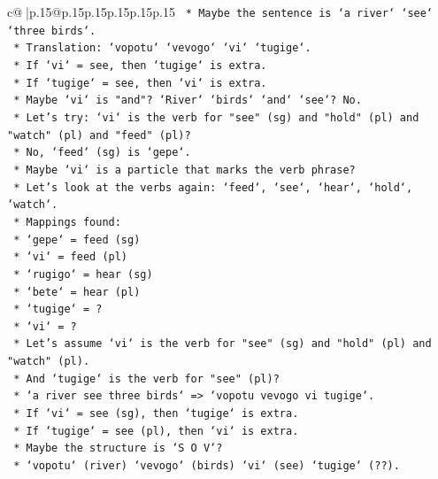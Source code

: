 \documentclass{article}
\begin{document}
{\begin{supertabular}{c@{$\;$}|p{.15\linewidth}@{}p{.15\linewidth}p{.15\linewidth}p{.15\linewidth}p{.15\linewidth}p{.15\linewidth}}
{{{\texttt{                *   Maybe the sentence is `a river` `see` `three birds`.} \\
\texttt{                *   Translation: `vopotu` `vevogo` `vi` `tugige`.} \\
\texttt{                *   If `vi` = see, then `tugige` is extra.} \\
\texttt{                *   If `tugige` = see, then `vi` is extra.} \\
\texttt{                *   Maybe `vi` is "and"? `River` `birds` `and` `see`? No.} \\
\texttt{                *   Let's try: `vi` is the verb for "see" (sg) and "hold" (pl) and "watch" (pl) and "feed" (pl)?} \\
\texttt{                *   No, `feed` (sg) is `gepe`.} \\
\texttt{                *   Maybe `vi` is a particle that marks the verb phrase?} \\
\texttt{                *   Let's look at the verbs again: `feed`, `see`, `hear`, `hold`, `watch`.} \\
\texttt{                *   Mappings found:} \\
\texttt{                    *   `gepe` = feed (sg)} \\
\texttt{                    *   `vi` = feed (pl)} \\
\texttt{                    *   `rugigo` = hear (sg)} \\
\texttt{                    *   `bete` = hear (pl)} \\
\texttt{                    *   `tugige` = ?} \\
\texttt{                    *   `vi` = ?} \\
\texttt{                *   Let's assume `vi` is the verb for "see" (sg) and "hold" (pl) and "watch" (pl).} \\
\texttt{                *   And `tugige` is the verb for "see" (pl)?} \\
\texttt{                *   `a river see three birds` => `vopotu vevogo vi tugige`.} \\
\texttt{                *   If `vi` = see (sg), then `tugige` is extra.} \\
\texttt{                *   If `tugige` = see (pl), then `vi` is extra.} \\
\texttt{                *   Maybe the structure is `S O V`?} \\
\texttt{                *   `vopotu` (river) `vevogo` (birds) `vi` (see) `tugige` (??).} \\
}}}
\end{supertabular}}
\end{document}
